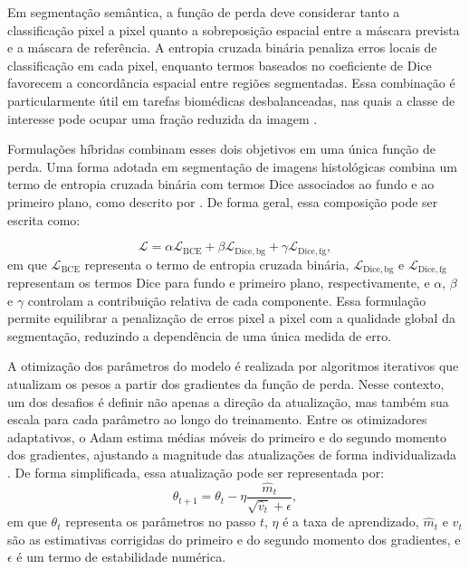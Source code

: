 Em segmentação semântica, a função de perda deve considerar tanto a classificação pixel a pixel quanto a sobreposição espacial entre a máscara prevista e a máscara de referência. A entropia cruzada binária penaliza erros locais de classificação em cada pixel, enquanto termos baseados no coeficiente de Dice favorecem a concordância espacial entre regiões segmentadas. Essa combinação é particularmente útil em tarefas biomédicas desbalanceadas, nas quais a classe de interesse pode ocupar uma fração reduzida da imagem \cite{sudre2017generalised}.

Formulações híbridas combinam esses dois objetivos em uma única função de perda. Uma forma adotada em segmentação de imagens histológicas combina um termo de entropia cruzada binária com termos Dice associados ao fundo e ao primeiro plano, como descrito por \textcite{khened2021generalized}. De forma geral, essa composição pode ser escrita como: 

\begin{equation}\label{eq:hybrid-loss} \mathcal{L} = \alpha \mathcal{L}_{\mathrm{BCE}} + \beta \mathcal{L}_{\mathrm{Dice,bg}} + \gamma \mathcal{L}_{\mathrm{Dice,fg}}, \end{equation} 
em que $\mathcal{L}_{\mathrm{BCE}}$ representa o termo de entropia cruzada binária, $\mathcal{L}_{\mathrm{Dice,bg}}$ e $\mathcal{L}_{\mathrm{Dice,fg}}$ representam os termos Dice para fundo e primeiro plano, respectivamente, e $\alpha$, $\beta$ e $\gamma$ controlam a contribuição relativa de cada componente. Essa formulação permite equilibrar a penalização de erros pixel a pixel com a qualidade global da segmentação, reduzindo a dependência de uma única medida de erro. 

A otimização dos parâmetros do modelo é realizada por algoritmos iterativos que atualizam os pesos a partir dos gradientes da função de perda. Nesse contexto, um dos desafios é definir não apenas a direção da atualização, mas também sua escala para cada parâmetro ao longo do treinamento. Entre os otimizadores adaptativos, o Adam estima médias móveis do primeiro e do segundo momento dos gradientes, ajustando a magnitude das atualizações de forma individualizada \cite{kingma2015adam}. De forma simplificada, essa atualização pode ser representada por: 
\begin{equation}\label{eq:adam-update} \theta_{t+1} = \theta_t - \eta \frac{\hat{m}_t}{\sqrt{\hat{v}_t}+\epsilon}, \end{equation} 
em que $\theta_t$ representa os parâmetros no passo $t$, $\eta$ é a taxa de aprendizado, $\hat{m}_t$ e $\hat{v}_t$ são as estimativas corrigidas do primeiro e do segundo momento dos gradientes, e $\epsilon$ é um termo de estabilidade numérica. 

